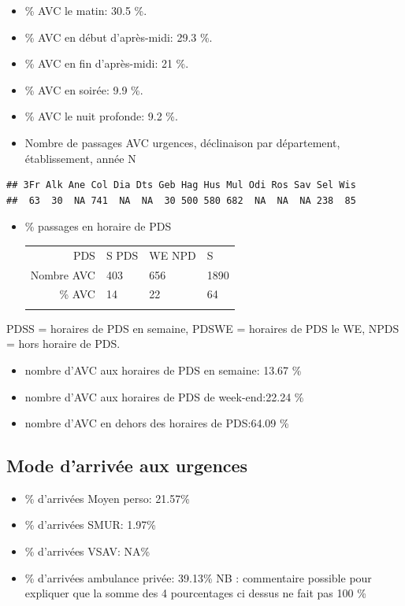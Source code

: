 \documentclass[]{article}
\begin{document}
\begin{itemize}
\item
  \% AVC le matin: 30.5 \%.
\item
  \% AVC en début d'après-midi: 29.3 \%.
\item
  \% AVC en fin d'après-midi: 21 \%.
\item
  \% AVC en soirée: 9.9 \%.
\item
  \% AVC le nuit profonde: 9.2 \%.
\item
  Nombre de passages AVC urgences, déclinaison par département,
  établissement, année N
\end{itemize}

\begin{verbatim}
## 3Fr Alk Ane Col Dia Dts Geb Hag Hus Mul Odi Ros Sav Sel Wis 
##  63  30  NA 741  NA  NA  30 500 580 682  NA  NA  NA 238  85
\end{verbatim}

\begin{itemize}
\item
  \% passages en horaire de PDS

  \begin{longtable}[c]{@{}rlll@{}}
  \toprule\addlinespace
  PDS & S PDS & WE NPD & S
  \\\addlinespace
  \midrule\endhead
  Nombre AVC & 403 & 656 & 1890
  \\\addlinespace
  \% AVC & 14 & 22 & 64
  \\\addlinespace
  \bottomrule
  \end{longtable}
\end{itemize}

PDSS = horaires de PDS en semaine, PDSWE = horaires de PDS le WE, NPDS =
hors horaire de PDS.

\begin{itemize}
\itemsep1pt\parskip0pt
\item
  nombre d'AVC aux horaires de PDS en semaine: 13.67 \%
\item
  nombre d'AVC aux horaires de PDS de week-end:22.24 \%
\item
  nombre d'AVC en dehors des horaires de PDS:64.09 \%
\end{itemize}

\subsection{Mode d'arrivée aux
urgences}\label{mode-darrivee-aux-urgences}

\begin{itemize}
\itemsep1pt\parskip0pt
\item
  \% d'arrivées Moyen perso: 21.57\%
\item
  \% d'arrivées SMUR: 1.97\%
\item
  \% d'arrivées VSAV: NA\%
\item
  \% d'arrivées ambulance privée: 39.13\% NB : commentaire possible pour
  expliquer que la somme des 4 pourcentages ci dessus ne fait pas 100 \%
\end{itemize}
\end{document}
